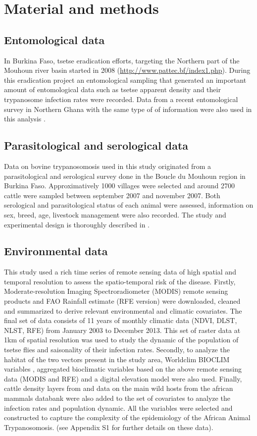 \documentclass[10pt]{article}
\begin{document}
\section*{Material and methods}
\label{unnumbered-4}
\subsection*{Entomological data}
\label{unnumbered-5}
In Burkina Faso, tsetse eradication efforts, targeting the Northern part of the Mouhoun river basin 
started in 2008 (\url{http://www.pattec.bf/index1.php}). During this eradication project an entomological sampling
that generated an important amount of entomological data such as tsetse apparent density and their trypanosome infection rates were recorded. 
Data from a recent entomological survey in Northern Ghana with the same type of of information were also used in this analysis \cite{adam2012bovine}.
\subsection*{Parasitological and serological data}
\label{unnumbered-6}
Data on bovine trypanosomosis used in this study originated from a parasitological and serological survey done in the Boucle du Mouhoun region in Burkina Faso.
Approximatively 1000 villages were selected and around 2700 cattle were sampled between 
september 2007 and november 2007. Both serological and parasitological status of each animal were assessed, information on sex, breed, age, livestock management were also recorded.
The study and experimental design is thoroughly described in \cite{sow2013baseline}.

\subsection*{Environmental data}
\label{unnumbered-7}
This study used a rich time series of remote sensing data of high spatial and temporal resolution to assess the spatio-temporal risk of the disease.
Firstly, Moderate-resolution Imaging Spectroradiometer (MODIS) remote sensing products and FAO Rainfall estimate (RFE version) were downloaded, cleaned 
and summarized to derive relevant environmental and climatic covariates. 
The final set of data consists of 11 years of monthly climatic data (NDVI, DLST, NLST, RFE) from January 2003 to December 2013.
This set of raster data at 1km of spatial resolution was used to study the dynamic of the population of tsetse flies and saisonality of their infection rates.
Secondly, to analyze the habitat of the two vectors present in the study area, Worldclim BIOCLIM variables \cite{hijmans2005worldclim}, aggregated bioclimatic variables based on the above remote sensing data (MODIS and RFE) and 
a digital elevation model were also used.
Finally, cattle density layers from \cite{robinsonmapping2014} and data on the main wild hosts from the african mammals databank \cite{union1999databank} were also added to the set of covariates
to analyze the infection rates and population dynamic.  
All the variables were selected and constructed to capture the complexity of the epidemiology of the African Animal Trypanosomosis.
(see Appendix S1 for further details on these data).
\end{document}
